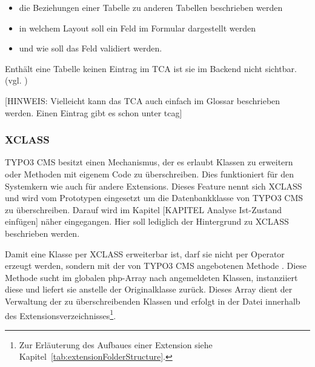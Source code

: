 \begin{itemize}
	\itemsep1pt\parskip0pt
	\item
		die Beziehungen einer Tabelle zu anderen Tabellen beschrieben werden
	\item
		in welchem Layout soll ein Feld im Formular dargestellt werden
	\item
		und wie soll das Feld validiert werden.
\end{itemize}

Enthält eine Tabelle keinen Eintrag im TCA ist sie im Backend nicht sichtbar.(vgl. \cite{web:typo3TCA})

[HINWEIS: Vielleicht kann das TCA auch einfach im Glossar beschrieben werden. Einen Eintrag gibt es schon unter tcag]

\subsubsection{XCLASS}
TYPO3 CMS besitzt einen Mechanismus, der es erlaubt Klassen zu erweitern oder Methoden mit eigenem Code zu überschreiben. Dies funktioniert für den Systemkern wie auch für andere Extensions. Dieses Feature nennt sich XCLASS und wird vom Prototypen eingesetzt um die Datenbankklasse von TYPO3 CMS zu überschreiben. Darauf wird im Kapitel [KAPITEL Analyse Ist-Zustand einfügen] näher eingegangen. Hier soll lediglich der Hintergrund zu XCLASS beschrieben werden.

Damit eine Klasse per XCLASS erweiterbar ist, darf sie nicht per  Operator erzeugt werden, sondern mit der von TYPO3 CMS angebotenen Methode . Diese Methode sucht im globalen \gls{php}-Array  nach angemeldeten Klassen, instanziiert diese und liefert sie anstelle der Originalklasse zurück. Dieses Array dient der Verwaltung der zu überschreibenden Klassen und erfolgt in der Datei  innerhalb des Extensionsverzeichnisses\footnote{Zur Erläuterung des Aufbaues einer Extension siehe Kapitel~\ref{tab:extensionFolderStructure}.}.


